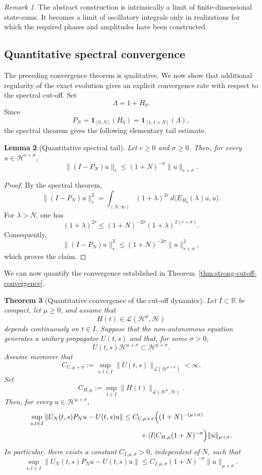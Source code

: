 \documentclass[11pt]{amsart}
\theoremstyle{plain}
\newtheorem{theorem}{Theorem}[section]
\newtheorem{lemma}[theorem]{Lemma}
\theoremstyle{definition}
\theoremstyle{remark}
\newtheorem{remark}[theorem]{Remark}
\newcommand{\Hilb}{\mathcal H}
\begin{document}
\begin{remark}
The abstract construction is intrinsically a limit of finite-dimensional
state-sums. It becomes a limit of oscillatory integrals only in realizations
for which the required phases and amplitudes have been constructed.
\end{remark}

\subsection{Quantitative spectral convergence}
\label{subsec:quantitative-spectral-convergence}

The preceding convergence theorem is qualitative. We now show that additional
regularity of the exact evolution gives an explicit convergence rate with
respect to the spectral cut-off. Set
\[
\Lambda=1+H_{0}.
\]
Since
\[
P_{N}=\mathbf{1}_{[0,N]}(H_{0})
      =\mathbf{1}_{[1,1+N]}(\Lambda),
\]
the spectral theorem gives the following elementary tail estimate.

\begin{lemma}[Quantitative spectral tail]
\label{lem:quantitative-spectral-tail}
Let \(r\geq 0\) and \(\sigma\geq 0\). Then, for every
\(u\in\Hilb^{r+\sigma}\),
\[
\|(I-P_{N})u\|_{r}
\leq
(1+N)^{-\sigma}\|u\|_{r+\sigma}.
\]
\end{lemma}

\begin{proof}
By the spectral theorem,
\[
\|(I-P_{N})u\|_{r}^{2}
=
\int_{(N,\infty)}
(1+\lambda)^{2r}\,d\langle E_{H_{0}}(\lambda)u,u\rangle.
\]
For \(\lambda>N\), one has
\[
(1+\lambda)^{2r}
\leq
(1+N)^{-2\sigma}(1+\lambda)^{2(r+\sigma)}.
\]
Consequently,
\[
\|(I-P_{N})u\|_{r}^{2}
\leq
(1+N)^{-2\sigma}\|u\|_{r+\sigma}^{2},
\]
which proves the claim.
\end{proof}

We can now quantify the convergence established in
Theorem~\ref{thm:strong-cutoff-convergence}.

\begin{theorem}[Quantitative convergence of the cut-off dynamics]
\label{thm:quantitative-cutoff-convergence}
Let \(I\subset\mathbb{R}\) be compact, let \(\mu\geq 0\), and assume that
\[
H(t)\in\mathcal{L}(\Hilb^{\mu},\Hilb)
\]
depends continuously on \(t\in I\). Suppose that the non-autonomous equation
generates a unitary propagator \(U(t,s)\) and that, for some \(\sigma>0\),
\[
U(t,s)\Hilb^{\mu+\sigma}
\subset
\Hilb^{\mu+\sigma}.
\]
Assume moreover that
\[
C_{U,\mu+\sigma}
:=
\sup_{s,t\in I}
\|U(t,s)\|_{\mathcal{L}(\Hilb^{\mu+\sigma})}
<\infty.
\]
Set
\[
C_{H,\mu}
:=
\sup_{t\in I}
\|H(t)\|_{\mathcal{L}(\Hilb^{\mu},\Hilb)}.
\]
Then, for every \(u\in\Hilb^{\mu+\sigma}\),
\[
\begin{split}
\sup_{s,t\in I}
\|U_{N}(t,s)P_{N}u-U(t,s)u\|
\leq{}&
C_{U,\mu+\sigma}
\Bigl(
(1+N)^{-(\mu+\sigma)}
\\
&\quad
+
|I|C_{H,\mu}(1+N)^{-\sigma}
\Bigr)
\|u\|_{\mu+\sigma}.
\end{split}
\]
In particular, there exists a constant \(C_{I,\mu,\sigma}>0\),
independent of \(N\), such that
\[
\sup_{s,t\in I}
\|U_{N}(t,s)P_{N}u-U(t,s)u\|
\leq
C_{I,\mu,\sigma}(1+N)^{-\sigma}
\|u\|_{\mu+\sigma}.
\]
\end{theorem}
\end{document}
